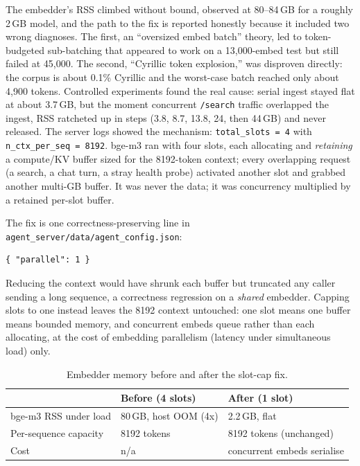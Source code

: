 The embedder's RSS climbed without bound, observed at 80--84\,GB for a roughly 2\,GB model,
and the path to the fix is reported honestly because it included two wrong diagnoses. The
first, an ``oversized embed batch'' theory, led to token-budgeted sub-batching that
appeared to work on a 13,000-embed test but still failed at 45,000. The second, ``Cyrillic
token explosion,'' was disproven directly: the corpus is about 0.1\% Cyrillic and the
worst-case batch reached only about 4,900 tokens. Controlled experiments found the real
cause: serial ingest stayed flat at about 3.7\,GB, but the moment concurrent
\verb|/search| traffic overlapped the ingest, RSS ratcheted up in steps (3.8, 8.7, 13.8,
24, then 44\,GB) and never released. The server logs showed the mechanism:
\verb|total_slots = 4| with \verb|n_ctx_per_seq = 8192|. bge-m3 ran with four slots, each
allocating and \emph{retaining} a compute/KV buffer sized for the 8192-token context;
every overlapping request (a search, a chat turn, a stray health probe) activated another
slot and grabbed another multi-GB buffer. It was never the data; it was concurrency
multiplied by a retained per-slot buffer.

The fix is one correctness-preserving line in \verb|agent_server/data/agent_config.json|:

\begin{verbatim}
{ "parallel": 1 }
\end{verbatim}

Reducing the context would have shrunk each buffer but truncated any caller sending a long
sequence, a correctness regression on a \emph{shared} embedder. Capping slots to one
instead leaves the 8192 context untouched: one slot means one buffer means bounded memory,
and concurrent embeds queue rather than each allocating, at the cost of embedding
parallelism (latency under simultaneous load) only.

\begin{table}[h]
\centering\small
\caption{Embedder memory before and after the slot-cap fix.}
\begin{tabular}{lll}
\toprule
& \textbf{Before (4 slots)} & \textbf{After (1 slot)} \\
\midrule
bge-m3 RSS under load & 80\,GB, host OOM (4x) & 2.2\,GB, flat \\
Per-sequence capacity & 8192 tokens           & 8192 tokens (unchanged) \\
Cost                  & n/a                   & concurrent embeds serialise \\
\bottomrule
\end{tabular}
\end{table}

